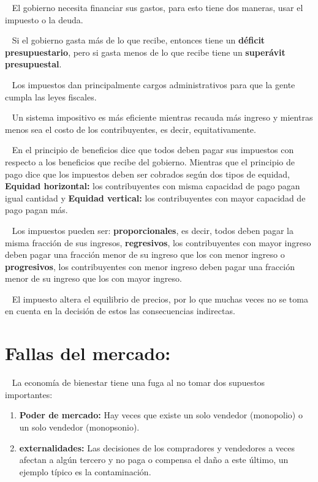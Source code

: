 \documentclass[
  letterpaper,
  DIV=11,
  numbers=noendperiod]{scrreport}
\begin{document}
~ El gobierno necesita financiar sus gastos, para esto tiene dos
maneras, usar el impuesto o la deuda.

~ Si el gobierno gasta más de lo que recibe, entonces tiene un
\textbf{déficit presupuestario}, pero si gasta menos de lo que recibe
tiene un \textbf{superávit presupuestal}.

~ Los impuestos dan principalmente cargos administrativos para que la
gente cumpla las leyes fiscales.

~ Un sistema impositivo es más eficiente mientras recauda más ingreso y
mientras menos sea el costo de los contribuyentes, es decir,
equitativamente.

~ En el principio de beneficios dice que todos deben pagar sus impuestos
con respecto a los beneficios que recibe del gobierno. Mientras que el
principio de pago dice que los impuestos deben ser cobrados según dos
tipos de equidad, \textbf{Equidad horizontal:} los contribuyentes con
misma capacidad de pago pagan igual cantidad y \textbf{Equidad
vertical:} los contribuyentes con mayor capacidad de pago pagan más.

~ Los impuestos pueden ser: \textbf{proporcionales}, es decir, todos
deben pagar la misma fracción de sus ingresos, \textbf{regresivos}, los
contribuyentes con mayor ingreso deben pagar una fracción menor de su
ingreso que los con menor ingreso o \textbf{progresivos}, los
contribuyentes con menor ingreso deben pagar una fracción menor de su
ingreso que los con mayor ingreso.

~ El impuesto altera el equilibrio de precios, por lo que muchas veces
no se toma en cuenta en la decisión de estos las consecuencias
indirectas.

\hypertarget{fallas-del-mercado}{%
\section{Fallas del mercado:}\label{fallas-del-mercado}}

~ La economía de bienestar tiene una fuga al no tomar dos supuestos
importantes:

\begin{enumerate}
\def\labelenumi{\arabic{enumi}.}
\item
  \textbf{Poder de mercado:} Hay veces que existe un solo vendedor
  (monopolio) o un solo vendedor (monopsonio).
\item
  \textbf{externalidades:} Las decisiones de los compradores y
  vendedores a veces afectan a algún tercero y no paga o compensa el
  daño a este último, un ejemplo típico es la contaminación.
\end{enumerate}
\end{document}
